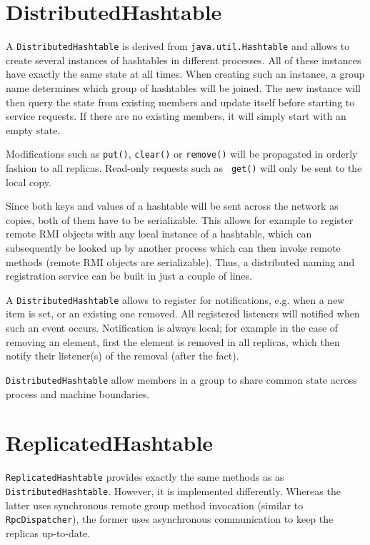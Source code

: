   \section{DistributedHashtable} \label{DistributedHashtable}

  A {\tt DistributedHashtable} is derived from {\tt java.util.Hashtable} and allows
  to create several instances of hashtables in different processes. All of these
  instances have exactly the same state at all times. When creating such an instance,
  a group name determines which group of hashtables will be joined. The new instance
  will then query the state from existing members and update itself before starting
  to service requests. If there are no existing members, it will simply start with an
  empty state.

  Modifications such as {\tt put()}, {\tt clear()} or {\tt remove()} will be
  propagated in orderly fashion to all replicas. Read-only requests such as {\tt
  get()} will only be sent to the local copy.

  Since both keys and values of a hashtable will be sent across the network as
  copies, both of them have to be serializable. This allows for example to register
  remote RMI objects with any local instance of a hashtable, which can subsequently
  be looked up by another process which can then invoke remote methods (remote RMI
  objects are serializable). Thus, a distributed naming and registration service can
  be built in just a couple of lines.

  A {\tt DistributedHashtable} allows to register for notifications, e.g. when a new
  item is set, or an existing one removed. All registered listeners will notified
  when such an event occurs. Notification is always local; for example in the case of
  removing an element, first the element is removed in all replicas, which then
  notify their listener(s) of the removal (after the fact).

  {\tt DistributedHashtable} allow members in a group to share common state across
  process and machine boundaries.



  \section{ReplicatedHashtable}

  {\tt ReplicatedHashtable} provides exactly the same methods as as {\tt
  DistributedHashtable}. However, it is implemented differently. Whereas the latter
  uses synchronous remote group method invocation (similar to {\tt RpcDispatcher}),
  the former uses asynchronous communication to keep the replicas up-to-date.
  


